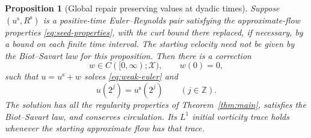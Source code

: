 \documentclass[11pt,a4paper,reqno]{amsart}
\theoremstyle{plain}
\newtheorem{proposition}[theorem]{Proposition}
\theoremstyle{definition}
\theoremstyle{remark}
\numberwithin{equation}{section}
\newcommand{\X}{\mathcal X}
\begin{document}
\begin{proposition}[Global repair preserving values at dyadic times]\label{prop:global}
Suppose $(u^{\mathrm s},R^{\mathrm s})$ is a positive-time
Euler--Reynolds pair satisfying the approximate-flow properties
\eqref{eq:seed-properties}, with the curl bound there replaced, if
necessary, by a bound on each finite time interval. The starting
velocity need not be given by the Biot--Savart law for this
proposition. Then there is a
correction
\begin{equation}\label{eq:global-correction}
 w\in C([0,\infty);\X),\qquad w(0)=0,
\end{equation}
such that $u=u^{\mathrm s}+w$ solves \eqref{eq:weak-euler} and
\begin{equation}\label{eq:time-anchors}
 u(2^j)=u^{\mathrm s}(2^j)\qquad(j\in\mathbb Z).
\end{equation}
The solution has all the regularity properties of
Theorem~\ref{thm:main}, satisfies the Biot--Savart law, and conserves
circulation. Its $L^1$ initial vorticity trace holds whenever the
starting approximate flow has that trace.
\end{proposition}
\end{document}
